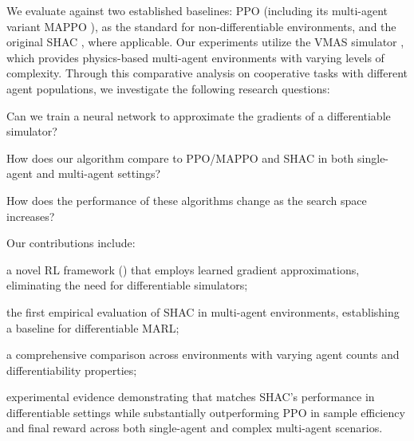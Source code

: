 We evaluate \fname{} against two established baselines: PPO \cite{Schulman17} (including its multi-agent variant MAPPO \cite{DBLP:conf/nips/YuVVGWBW22}), as the standard for non-differentiable environments, and the original SHAC \cite{Xu22}, where applicable. Our experiments utilize the VMAS simulator \cite{DBLP:conf/dars/BettiniKBP22}, which provides physics-based multi-agent environments with varying levels of complexity. Through this comparative analysis on cooperative tasks with different agent populations, we investigate the following research questions:

\begin{compactitem}
    \item {} Can we train a neural network to approximate the gradients of a differentiable simulator?
    \item {} How does our algorithm compare to PPO/MAPPO and SHAC in both single-agent and multi-agent settings?
    \item {} How does the performance of these algorithms change as the search space increases?
\end{compactitem}

\noindent Our contributions include:
\begin{compactitem}
    \item a novel RL framework (\fname{}) that employs learned gradient approximations, eliminating the need for differentiable simulators;
    \item the first empirical evaluation of SHAC in multi-agent environments, establishing a baseline for differentiable MARL;
    \item a comprehensive comparison across environments with varying agent counts and differentiability properties;
    \item experimental evidence demonstrating that \fname{} matches SHAC's performance in differentiable settings while substantially outperforming PPO in sample efficiency and final reward across both single-agent and complex multi-agent scenarios.
\end{compactitem}
